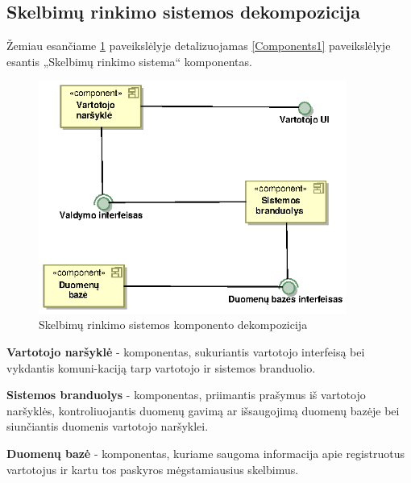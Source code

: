 \documentclass[12pt]{article}
\begin{document}
	\subsection{Skelbimų rinkimo sistemos dekompozicija}
	Žemiau esančiame \ref{Components2} paveikslėlyje detalizuojamas \ref{Components1} paveikslėlyje esantis „Skelbimų rinkimo sistema“ komponentas.
	\begin{figure}[h]
		\begin{center}
			\includegraphics[width=0.9\textwidth]{Komponentai2.eps}
			\caption{Skelbimų rinkimo sistemos komponento dekompozicija\label{Components2}}
		\end{center}
	\end{figure}

	\textbf{Vartotojo naršyklė} - komponentas, sukuriantis vartotojo interfeisą bei vykdantis komuni-kaciją tarp vartotojo ir sistemos branduolio.

	
	\textbf{Sistemos branduolys} - komponentas, priimantis prašymus iš vartotojo naršyklės, kontroliuojantis duomenų gavimą ar išsaugojimą duomenų bazėje bei siunčiantis duomenis vartotojo naršyklei.

	
	\textbf{Duomenų bazė} - komponentas, kuriame saugoma informacija apie registruotus vartotojus ir kartu tos paskyros mėgstamiausius skelbimus.
	\pagebreak
\end{document}

